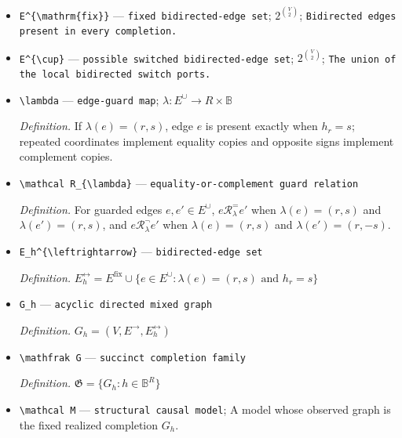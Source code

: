 \documentclass{article}
\begin{document}
\begin{itemize}
  \item \texttt{E\textasciicircum{}\{\textbackslash{}\allowbreak{}mathrm\{fix\}\allowbreak{}\}\allowbreak{}} --- \texttt{fixed bidirected-\allowbreak{}edge set}; \(2^{\binom{V}{2}}\); \texttt{Bidirected edges present in every completion.}
  \item \texttt{E\textasciicircum{}\{\textbackslash{}\allowbreak{}cup\}\allowbreak{}} --- \texttt{possible switched bidirected-\allowbreak{}edge set}; \(2^{\binom{V}{2}}\); \texttt{The union of the local bidirected switch ports.}
  \item \texttt{\textbackslash{}\allowbreak{}lambda} --- \texttt{edge-\allowbreak{}guard map}; \(\lambda:E^{\cup}\to R\times\mathbb B\)
  \par\smallskip\noindent\emph{Definition.} If \(\lambda(e)=(r,s)\), edge \(e\) is present exactly when \(h_r=s\); repeated coordinates implement equality copies and opposite signs implement complement copies.
  \item \texttt{\textbackslash{}\allowbreak{}mathcal R\_\allowbreak{}\{\textbackslash{}\allowbreak{}lambda\}\allowbreak{}} --- \texttt{equality-\allowbreak{}or-\allowbreak{}complement guard relation}
  \par\smallskip\noindent\emph{Definition.} For guarded edges \(e,e'\in E^{\cup}\), \(e\mathrel{\mathcal R_{\lambda}^{=}}e'\) when \(\lambda(e)=(r,s)\) and \(\lambda(e')=(r,s)\), and \(e\mathrel{\mathcal R_{\lambda}^{\neg}}e'\) when \(\lambda(e)=(r,s)\) and \(\lambda(e')=(r,-s)\).
  \item \texttt{E\_\allowbreak{}h\textasciicircum{}\{\textbackslash{}\allowbreak{}leftrightarrow\}\allowbreak{}} --- \texttt{bidirected-\allowbreak{}edge set}
  \par\smallskip\noindent\emph{Definition.} \(E_h^{\leftrightarrow}=E^{\mathrm{fix}}\cup\{e\in E^{\cup}:\lambda(e)=(r,s)\text{ and }h_r=s\}\)
  \item \texttt{G\_\allowbreak{}h} --- \texttt{acyclic directed mixed graph}
  \par\smallskip\noindent\emph{Definition.} \(G_h=(V,E^{\to},E_h^{\leftrightarrow})\)
  \item \texttt{\textbackslash{}\allowbreak{}mathfrak G} --- \texttt{succinct completion family}
  \par\smallskip\noindent\emph{Definition.} \(\mathfrak G=\{G_h:h\in\mathbb B^R\}\)
  \item \texttt{\textbackslash{}\allowbreak{}mathcal M} --- \texttt{structural causal model}; A model whose observed graph is the fixed realized completion \(G_h\).

\end{itemize}
\end{document}
